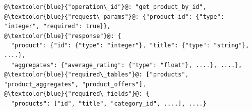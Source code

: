 

\begin{table}[t]
	\centering
	\caption{Example of interface schema snippet with rich annotations and explicit database constraints. 
	}
	\label{tab:demo_api_schema}
	\small

	\begin{minipage}{0.95\columnwidth}
\begin{lstlisting}[style=apischema]
@\textcolor{blue}{"operation\_id"}@: "get_product_by_id",
@\textcolor{blue}{"request\_params"}@: {"product_id": {"type": "integer", "required": true}},
@\textcolor{blue}{"response"}@: {
  "product": {"id": {"type": "integer"}, "title": {"type": "string"}, ....},
  "aggregates": {"average_rating": {"type": "float"}, ....}, ....},
@\textcolor{blue}{"required\_tables"}@: ["products", "product_aggregates", "product_offers"],
@\textcolor{blue}{"required\_fields"}@: {
  "products": ["id", "title", "category_id", ....], ....}\end{lstlisting}
	\end{minipage}
\end{table}

